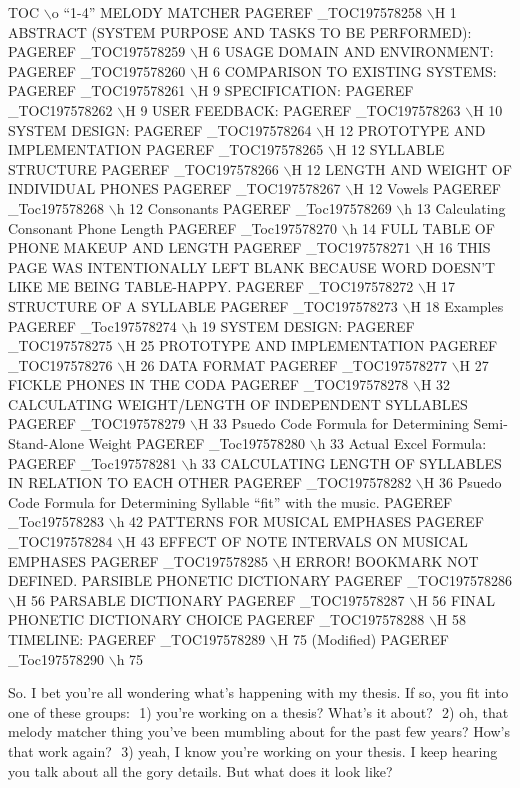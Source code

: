 \documentclass[10pt,oneside]{memoir}
\begin{document}
\pagebreak TOC $\backslash$o ``1-4'' 
MELODY MATCHER   PAGEREF \_TOC197578258 $\backslash$H 1
ABSTRACT (SYSTEM PURPOSE AND TASKS TO BE PERFORMED):     PAGEREF \_TOC197578259 $\backslash$H 6
USAGE DOMAIN AND ENVIRONMENT:    PAGEREF \_TOC197578260 $\backslash$H 6
COMPARISON TO EXISTING SYSTEMS:  PAGEREF \_TOC197578261 $\backslash$H 9
SPECIFICATION:   PAGEREF \_TOC197578262 $\backslash$H 9
USER FEEDBACK:   PAGEREF \_TOC197578263 $\backslash$H 10
SYSTEM DESIGN:   PAGEREF \_TOC197578264 $\backslash$H 12
PROTOTYPE AND IMPLEMENTATION     PAGEREF \_TOC197578265 $\backslash$H 12
SYLLABLE STRUCTURE   PAGEREF \_TOC197578266 $\backslash$H 12
LENGTH AND WEIGHT OF INDIVIDUAL PHONES   PAGEREF \_TOC197578267 $\backslash$H 12
Vowels   PAGEREF \_Toc197578268 $\backslash$h 12
Consonants   PAGEREF \_Toc197578269 $\backslash$h 13
Calculating Consonant Phone Length   PAGEREF \_Toc197578270 $\backslash$h 14
FULL TABLE OF PHONE MAKEUP AND LENGTH    PAGEREF \_TOC197578271 $\backslash$H 16
THIS PAGE WAS INTENTIONALLY LEFT BLANK BECAUSE WORD DOESN'T LIKE ME BEING TABLE-HAPPY.   PAGEREF \_TOC197578272 $\backslash$H 17
STRUCTURE OF A SYLLABLE  PAGEREF \_TOC197578273 $\backslash$H 18
Examples     PAGEREF \_Toc197578274 $\backslash$h 19
SYSTEM DESIGN:   PAGEREF \_TOC197578275 $\backslash$H 25
PROTOTYPE AND IMPLEMENTATION     PAGEREF \_TOC197578276 $\backslash$H 26
DATA FORMAT  PAGEREF \_TOC197578277 $\backslash$H 27
FICKLE PHONES IN THE CODA    PAGEREF \_TOC197578278 $\backslash$H 32
CALCULATING WEIGHT/LENGTH OF INDEPENDENT SYLLABLES   PAGEREF \_TOC197578279 $\backslash$H 33
Psuedo Code Formula for Determining Semi-Stand-Alone Weight  PAGEREF \_Toc197578280 $\backslash$h 33
Actual Excel Formula:    PAGEREF \_Toc197578281 $\backslash$h 33
CALCULATING LENGTH OF SYLLABLES IN RELATION TO EACH OTHER    PAGEREF \_TOC197578282 $\backslash$H 36
Psuedo Code Formula for Determining Syllable ``fit'' with the music.   PAGEREF \_Toc197578283 $\backslash$h 42
PATTERNS FOR MUSICAL EMPHASES    PAGEREF \_TOC197578284 $\backslash$H 43
EFFECT OF NOTE INTERVALS ON MUSICAL EMPHASES     PAGEREF \_TOC197578285 $\backslash$H ERROR! BOOKMARK NOT DEFINED.
PARSIBLE PHONETIC DICTIONARY     PAGEREF \_TOC197578286 $\backslash$H 56
PARSABLE DICTIONARY  PAGEREF \_TOC197578287 $\backslash$H 56
FINAL PHONETIC DICTIONARY CHOICE     PAGEREF \_TOC197578288 $\backslash$H 58
TIMELINE:    PAGEREF \_TOC197578289 $\backslash$H 75
(Modified)   PAGEREF \_Toc197578290 $\backslash$h 75


\pagebreak So. I bet you're all wondering what's happening with my thesis. If so, you fit into one of these groups:  1) you're working on a thesis? What's it about?  2) oh, that melody matcher thing you've been mumbling about for the past few years? How's that work again?  3) yeah, I know you're working on your thesis. I keep hearing you talk about all the gory details. But what does it look like?
\end{document}
